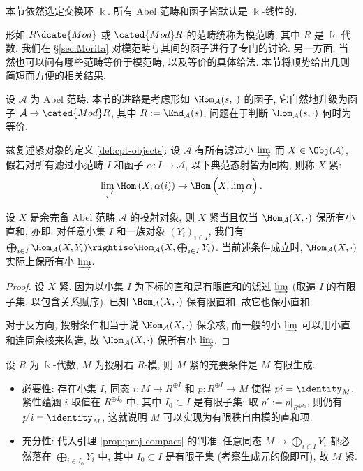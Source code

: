 本节依然选定交换环 $\Bbbk$. 所有 Abel 范畴和函子皆默认是 $\Bbbk$-线性的.

形如 $R\dcate{Mod}$ 或 $\cated{Mod}R$ 的范畴统称为模范畴, 其中 $R$ 是 $\Bbbk$-代数. 我们在 \S\ref{sec:Morita} 对模范畴与其间的函子进行了专门的讨论. 另一方面, 当然也可以问有哪些范畴等价于模范畴, 以及等价的具体给法. 本节将顺势给出几则简短而方便的相关结果.

设 $\mathcal{A}$ 为 Abel 范畴. 本节的进路是考虑形如 $\Hom_{\mathcal{A}}(s, \cdot)$ 的函子, 它自然地升级为函子 $\mathcal{A} \to \cated{Mod}R$, 其中 $R := \End_{\mathcal{A}}(s)$, 问题在于判断 $\Hom_{\mathcal{A}}(s, \cdot)$ 何时为等价.

兹复述紧对象的定义 \ref{def:cpt-objects}: 设 $\mathcal{A}$ 有所有滤过小 $\varinjlim$ 而 $X \in \Obj(\mathcal{A})$, 假若对所有滤过小范畴 $I$ 和函子 $\alpha: I \to \mathcal{A}$, 以下典范态射皆为同构, 则称 $X$ 紧:
\[ \varinjlim_i \Hom\left( X, \alpha(i) \right) \to \Hom\left( X, \varinjlim \alpha \right). \]

\begin{lemma}\label{prop:proj-compact}
	设 $X$ 是余完备 Abel 范畴 $\mathcal{A}$ 的投射对象, 则 $X$ 紧当且仅当 $\Hom_{\mathcal{A}}(X, \cdot)$ 保所有小直和, 亦即: 对任意小集 $I$ 和一族对象 $(Y_i)_{i \in I}$, 我们有 $\bigoplus_{i \in I} \Hom_{\mathcal{A}}(X, Y_i) \rightiso \Hom_{\mathcal{A}}(X, \bigoplus_{i \in I} Y_i)$. 当前述条件成立时, $\Hom_{\mathcal{A}}(X, \cdot)$ 实际上保所有小 $\varinjlim$.
\end{lemma}
\begin{proof}
	设 $X$ 紧. 因为以小集 $I$ 为下标的直和是有限直和的滤过 $\varinjlim$ (取遍 $I$ 的有限子集, 以包含关系赋序), 已知 $\Hom_{\mathcal{A}}(X, \cdot)$ 保有限直和, 故它也保小直和.
	
	对于反方向, 投射条件相当于说 $\Hom_{\mathcal{A}}(X, \cdot)$ 保余核, 而一般的小 $\varinjlim$ 可以用小直和连同余核来构造, 故 $\Hom_{\mathcal{A}}(X, \cdot)$ 保所有小 $\varinjlim$.
\end{proof}

\begin{example}
	设 $R$ 为 $\Bbbk$-代数, $M$ 为投射右 $R$-模, 则 $M$ 紧的充要条件是 $M$ 有限生成.
	\begin{itemize}
		\item 必要性: 存在小集 $I$, 同态 $i: M \to R^{\oplus I}$ 和 $p: R^{\oplus I} \to M$ 使得 $pi = \identity_M$. 紧性蕴涵 $i$ 取值在 $R^{\oplus I_0}$ 中, 其中 $I_0 \subset I$ 是有限子集; 取 $p' := p|_{R^{\oplus I_0}}$, 则仍有 $p' i = \identity_M$, 这就说明 $M$ 可以实现为有限秩自由模的直和项.
		\item 充分性: 代入引理 \ref{prop:proj-compact} 的判准. 任意同态 $M \to \bigoplus_{i \in I} Y_i$ 都必然落在 $\bigoplus_{i \in I_0} Y_i$ 中, 其中 $I_0 \subset I$ 是有限子集 (考察生成元的像即可), 故 $M$ 紧.
	\end{itemize}
\end{example}

